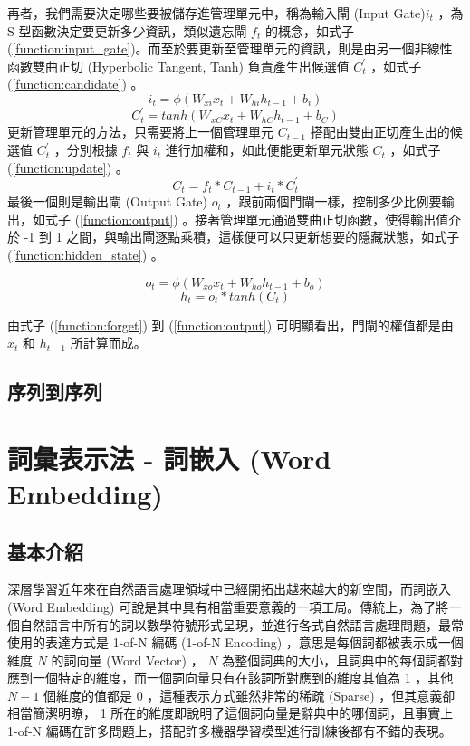 再者，我們需要決定哪些要被儲存進管理單元中，稱為輸入閘 (Input Gate)$i_t$ ，為 S 型函數決定要更新多少資訊，類似遺忘閘 $f_t$ 的概念，如式子 (\ref{function:input_gate})。而至於要更新至管理單元的資訊，則是由另一個非線性函數雙曲正切 (Hyperbolic Tangent, Tanh) 負責產生出候選值 $C_t^{'}$ ，如式子 (\ref{function:candidate}) 。
\begin{equation}
    i_t = \phi(W_{xi}x_t + W_{hi}h_{t-1} + b_i) \label{function:input_gate}
\end{equation}
\begin{equation}
    C_t^{'} = tanh(W_{xC}x_t + W_{hC}h_{t-1} + b_C) \label{function:candidate}
\end{equation}
更新管理單元的方法，只需要將上一個管理單元 $C_{t-1}$ 搭配由雙曲正切產生出的候選值 $C_t^{'}$ ，分別根據 $f_t$ 與 $i_t$ 進行加權和，如此便能更新單元狀態 $C_t$ ，如式子 (\ref{function:update}) 。
\begin{equation}
    C_t = f_t * C_{t-1} + i_t * C_t^{'} \label{function:update}
\end{equation}
最後一個則是輸出閘 (Output Gate) $o_t$ ，跟前兩個門閘一樣，控制多少比例要輸出，如式子 (\ref{function:output}) 。接著管理單元通過雙曲正切函數，使得輸出值介於 -1 到 1 之間，與輸出閘逐點乘積，這樣便可以只更新想要的隱藏狀態，如式子 (\ref{function:hidden_state}) 。

\begin{equation}
    o_t =  \phi(W_{xo}x_t + W_{ho}h_{t-1} + b_o) \label{function:output}
\end{equation}
\begin{equation}
    h_t = o_t * tanh(C_t) \label{function:hidden_state}
\end{equation}

由式子 (\ref{function:forget}) 到 (\ref{function:output}) 可明顯看出，門閘的權值都是由 $x_t$ 和 $h_{t-1}$ 所計算而成。
\subsection{序列到序列}
\section{詞彙表示法 - 詞嵌入 (Word Embedding)}
\subsection{基本介紹}
深層學習近年來在自然語言處理領域中已經開拓出越來越大的新空間，而詞嵌入 (Word Embedding) 可說是其中具有相當重要意義的一項工局。傳統上，為了將一個自然語言中所有的詞以數學符號形式呈現，並進行各式自然語言處理問題，最常使用的表達方式是 1-of-N 編碼 (1-of-N Encoding) ，意思是每個詞都被表示成一個維度 $N$ 的詞向量 (Word Vector) ， $N$ 為整個詞典的大小，且詞典中的每個詞都對應到一個特定的維度，而一個詞向量只有在該詞所對應到的維度其值為 1 ，其他 $N-1$ 個維度的值都是 0 ，這種表示方式雖然非常的稀疏 (Sparse) ，但其意義卻相當簡潔明瞭， 1 所在的維度即說明了這個詞向量是辭典中的哪個詞，且事實上 1-of-N 編碼在許多問題上，搭配許多機器學習模型進行訓練後都有不錯的表現。

